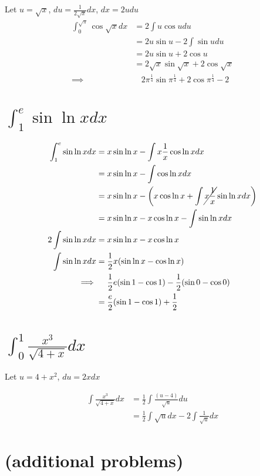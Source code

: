 \documentclass[letterpaper]{article}
\begin{document}
Let \(u = \sqrt{x}\), \(du = \frac{1}{2 \sqrt{x}} dx\), \(dx = 2 u du\)
\[\begin{aligned}
  \int_{0}^{ \sqrt{\pi} } \cos \sqrt{x} dx &= 2\int u \cos u  du\\
  &= 2u \sin  u - 2\int \sin u du\\
  &= 2 u \sin  u + 2 \cos  u\\
  &= 2 \sqrt{x} \sin  \sqrt{x} + 2 \cos  \sqrt{x}\\
  \implies  & \ \ \ \ 2 \pi^{\frac{1}{4}} \sin \pi^{\frac{1}{4}} + 2 \cos \pi ^{\frac{1}{4}}-2
  \end{aligned}\]


\section{\(\int_{1}^{e} \sin  \ln  x dx\)}
\label{sec:org04367de}

\[\begin{aligned}
  \int_{1}^{e} \sin  \ln  x dx &= x \sin  \ln  x - \int x \frac{1}{x} \cos \ln x dx\\
  &= x \sin  \ln  x - \int \cos \ln  x dx\\
  &= x \sin  \ln  x -\left( x \cos  \ln  x + \int \cancel{x \frac{1}{x}} \sin  \ln  x dx\right)\\
  &= x \sin  \ln  x - x \cos  \ln  x -\int \sin \ln x dx\\
  2\int \sin  \ln  x dx  &= x \sin  \ln  x - x \cos  \ln  x\\
 \int \sin  \ln  x dx &= \frac{1}{2}x (\sin  \ln  x - \cos  \ln  x)\\
 \implies &\ \ \ \ \frac{1}{2}e (\sin 1 - \cos  1) - \frac{1}{2} ( \sin  0 - \cos  0)\\
 &= \frac{e}{2} ( \sin  1 - \cos  1 ) + \frac{1}{2}
  \end{aligned}\]

\section{\(\int_{0}^{1} \frac{x^3}{\sqrt{4+x}} dx\)}
\label{sec:org7b1d792}
Let \(u = 4 + x^2\), \(du = 2xdx\)

\[\begin{aligned}
  \int \frac{x^3}{\sqrt{4+x}} dx &=\frac{1}{2}\int  \frac{(u-4)}{\sqrt{u}}du\\
  &= \frac{1}{2}\int \sqrt{u} dx - 2\int \frac{1}{\sqrt{u}} dx
  \end{aligned}\]

\section{(additional problems)}
\label{sec:org53f0a43}
\end{document}
